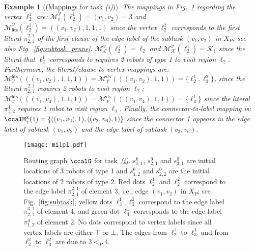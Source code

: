 \documentclass[Afour,sageh,times]{sagej}
\newtheorem{exmp}{Example}
\renewcommand{\ap}[3]{\mathcal{\pi}_{{#1},{#2}}^{#3}}
\newenvironment{cexmp}
{\addtocounter{exmp}{-1}\begin{exmp}}
  {\end{exmp}}
\begin{document}
\begin{cexmp}[(Mappings for task {\it (i)})]
    The mappings in Fig.~\ref{fig:milp} regarding the vertex $\ell_2^{1}$ are:
    $\mathcal{M}_e^{\mathcal{V}}(\ell_{2}^{1})  = (v_1,v_2) = 3$ and $\mathcal{M}_{\mathsf{lits}}^{\mathcal{V}}(\ell_{2}^{1})  = ((v_1,v_2), 1, 1, 1)$ since the vertex $\ell_2^{1}$ corresponds to the first literal $\ap{2}{1}{2,1}$ of the first clause of the edge label of the subtask $(v_1, v_2)$ in $X_P$; see also Fig.~\ref{fig:subtask_prune}.  $\mathcal{M}_\mathcal{L}^{\mathcal{V}}(\ell_{2}^{1})  = \ell_2$  and $\mathcal{M}_\mathcal{K}^{\mathcal{V}}(\ell_{2}^{1})  = \mathcal{K}_1$ since the literal that $\ell_2^1$ corresponds to requires 2 robots of type 1 to visit region $\ell_2$. Furthermore,  the literal/clause-to-vertex mappings are:
    $\mathcal{M}^{\mathsf{lits}}_{\mathcal{V}}(((v_1,v_2), 1, 1, 1)) = \mathcal{M}^{\mathsf{cls}}_{\mathcal{V}}(((v_1,v_2), 1, 1))  = \{\ell_2^{1}, \ell_2^{2}\}$, since the literal $\ap{2}{1}{2,1}$ requires 2 robots to visit region $\ell_2$; $\mathcal{M}^{\mathsf{lits}}_{\mathcal{V}}(((v_1,v_4), 1, 1, 1)) = \mathcal{M}^{\mathsf{cls}}_{\mathcal{V}}(((v_1,v_4), 1, 1))  = \{\ell_4^{1}\}$ since the literal $\ap{1}{2}{4}$ requires 1 robot to visit region $\ell_4$. Finally, the connector-to-label mapping is: $\ccalM^{\chi}_{\gamma} (1)  = \{((v_1, v_2), 1), ((v_3, v_6), 1)\}$ since the connector 1 appears in the edge label of subtask $(v_1 ,v_2)$ and the edge label of subtask $(v_3, v_6)$.
   \end{cexmp}
\begin{figure}[t]
  \centering
  \texttt{[image: milp1.pdf]}
  \caption{Routing graph $\ccalG$ for task~\hyperref[task:i]{\it (i)}. $s^0_{1,1}$, $s^0_{2,1}$ and $s^0_{3,1}$ are initial locations of 3 robots of type 1 and $s^0_{1,2}$ and $s^0_{2,2}$ are the initial locations of 2 robots of type 2. Red dots $\ell_{2}^{1}$ and $\ell_{2}^{2}$ correspond to the edge label $\ap{2}{1}{2,1}$ of element 3, i.e., edge $(v_1, v_2)$ in $X_P$; see Fig.~\ref{fig:subtask}, yellow dots $\ell_{3}^{1}, \ell_{3}^{2}$ correspond to the edge label $\ap{2}{1}{3,1}$ of element 4, and green dot $\ell_{4}^{1}$ corresponds to the edge label $\ap{1}{2}{4}$ of element 2. No dots correspond to vertex labels since all vertex labels are either $\top$ or $\bot$.  The edges from $\ell_2^{1}$ to $\ell_3^{1}$ and from $\ell_2^{2}$  to $\ell_3^{2}$ are due to $3 <_{P} 4$. }
    \label{fig:milp}
\end{figure}
\end{document}
